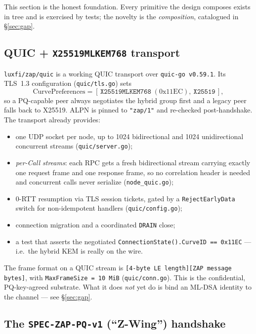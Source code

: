 \documentclass[11pt,a4paper]{article}
\newcommand{\code}[1]{\texttt{#1}}
\begin{document}
This section is the honest foundation. Every primitive the design
composes exists in tree and is exercised by tests; the novelty is the
\emph{composition}, catalogued in \S\ref{sec:gap}.

\subsection{QUIC + \texttt{X25519MLKEM768} transport}\label{sec:proven-quic}

\code{luxfi/zap/quic} is a working QUIC transport over
\code{quic-go~v0.59.1}. Its TLS~1.3 configuration
(\code{quic/tls.go}) sets
\[
  \text{CurvePreferences} = [\,\code{X25519MLKEM768}\;(\text{0x11EC}),\ \code{X25519}\,],
\]
so a PQ-capable peer always negotiates the hybrid group first and a
legacy peer falls back to X25519. ALPN is pinned to \code{"zap/1"} and
re-checked post-handshake. The transport already provides:

\begin{itemize}[nosep]
  \item one UDP socket per node, up to 1024 bidirectional and 1024
        unidirectional concurrent streams (\code{quic/server.go});
  \item \emph{per-Call streams}: each RPC gets a fresh bidirectional
        stream carrying exactly one request frame and one response frame,
        so no correlation header is needed and concurrent calls never
        serialize (\code{node\_quic.go});
  \item 0-RTT resumption via TLS session tickets, gated by a
        \code{RejectEarlyData} switch for non-idempotent handlers
        (\code{quic/config.go});
  \item connection migration and a coordinated \code{DRAIN} close;
  \item a test that asserts the negotiated
        \code{ConnectionState().CurveID == 0x11EC} --- i.e.\ the hybrid
        KEM is really on the wire.
\end{itemize}

The frame format on a QUIC stream is
\code{[4-byte LE length][ZAP message bytes]}, with \code{MaxFrameSize =
10\,MiB} (\code{quic/conn.go}). This is the confidential, PQ-key-agreed
substrate. What it does \emph{not} yet do is bind an ML-DSA identity to
the channel --- see \S\ref{sec:gap}.

\subsection{The \texttt{SPEC-ZAP-PQ-v1} (``Z-Wing'') handshake}\label{sec:proven-zappq}
\end{document}
